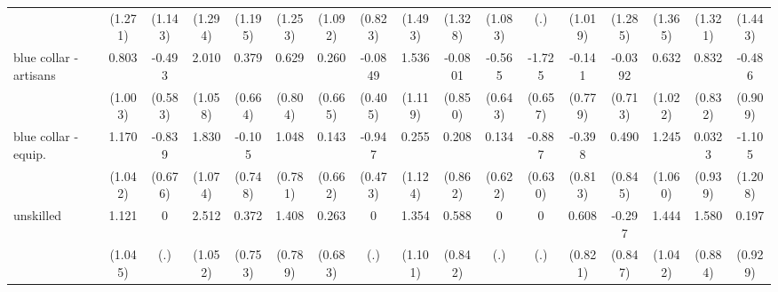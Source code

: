 {\begin{tabular}{l*{16}{c}}
                    &     (1.271)         &     (1.143)         &     (1.294)         &     (1.195)         &     (1.253)         &     (1.092)         &     (0.823)         &     (1.493)         &     (1.328)         &     (1.083)         &         (.)         &     (1.019)         &     (1.285)         &     (1.365)         &     (1.321)         &     (1.443)         \\
[1em]
blue collar - artisans&       0.803         &      -0.493         &       2.010         &       0.379         &       0.629         &       0.260         &     -0.0849         &       1.536         &     -0.0801         &      -0.565         &      -1.725\sym{**} &      -0.141         &     -0.0392         &       0.632         &       0.832         &      -0.486         \\
                    &     (1.003)         &     (0.583)         &     (1.058)         &     (0.664)         &     (0.804)         &     (0.665)         &     (0.405)         &     (1.119)         &     (0.850)         &     (0.643)         &     (0.657)         &     (0.779)         &     (0.713)         &     (1.022)         &     (0.832)         &     (0.909)         \\
[1em]
blue collar - equip.&       1.170         &      -0.839         &       1.830         &      -0.105         &       1.048         &       0.143         &      -0.947\sym{*}  &       0.255         &       0.208         &       0.134         &      -0.887         &      -0.398         &       0.490         &       1.245         &      0.0323         &      -1.105         \\
                    &     (1.042)         &     (0.676)         &     (1.074)         &     (0.748)         &     (0.781)         &     (0.662)         &     (0.473)         &     (1.124)         &     (0.862)         &     (0.622)         &     (0.630)         &     (0.813)         &     (0.845)         &     (1.060)         &     (0.939)         &     (1.208)         \\
[1em]
unskilled           &       1.121         &           0         &       2.512\sym{*}  &       0.372         &       1.408         &       0.263         &           0         &       1.354         &       0.588         &           0         &           0         &       0.608         &      -0.297         &       1.444         &       1.580         &       0.197         \\
                    &     (1.045)         &         (.)         &     (1.052)         &     (0.753)         &     (0.789)         &     (0.683)         &         (.)         &     (1.101)         &     (0.842)         &         (.)         &         (.)         &     (0.821)         &     (0.847)         &     (1.042)         &     (0.884)         &     (0.929)         \\

\end{tabular}}

